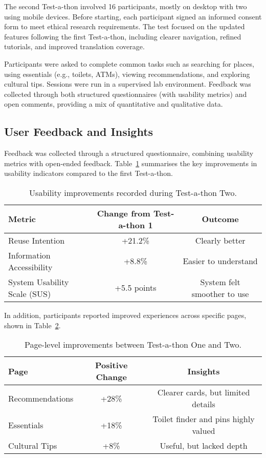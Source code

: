 The second Test-a-thon involved 16 participants, mostly on desktop with two using mobile devices. 
Before starting, each participant signed an informed consent form to meet ethical research requirements. 
The test focused on the updated features following the first Test-a-thon, including clearer navigation, 
refined tutorials, and improved translation coverage. 

Participants were asked to complete common tasks such as searching for places, using essentials (e.g., toilets, ATMs), 
viewing recommendations, and exploring cultural tips. Sessions were run in a supervised lab environment. 
Feedback was collected through both structured questionnaires (with usability metrics) and open comments, 
providing a mix of quantitative and qualitative data.

\subsection{User Feedback and Insights}
Feedback was collected through a structured questionnaire, combining usability metrics with open-ended feedback. Table~\ref{tab:usability-metrics} summarises the key improvements in usability indicators compared to the first Test-a-thon.

\begin{table}[H]
\centering
\small
\begin{tabular}{lcc}
\toprule
\textbf{Metric} & \textbf{Change from Test-a-thon 1} & \textbf{Outcome} \\
\midrule
Reuse Intention & +21.2\% & Clearly better \\
Information Accessibility & +8.8\% & Easier to understand \\
System Usability Scale (SUS) & +5.5 points & System felt smoother to use \\
\bottomrule
\end{tabular}
\caption{Usability improvements recorded during Test-a-thon Two.}
\label{tab:usability-metrics}
\end{table}

In addition, participants reported improved experiences across specific pages, shown in Table~\ref{tab:page-performance}.

\begin{table}[H]
\centering
\small
\begin{tabular}{lcc}
\toprule
\textbf{Page} & \textbf{Positive Change} & \textbf{Insights} \\
\midrule
Recommendations & +28\% & Clearer cards, but limited details \\
Essentials & +18\% & Toilet finder and pins highly valued \\
Cultural Tips & +8\% & Useful, but lacked depth \\
\bottomrule
\end{tabular}
\caption{Page-level improvements between Test-a-thon One and Two.}
\label{tab:page-performance}
\end{table}

